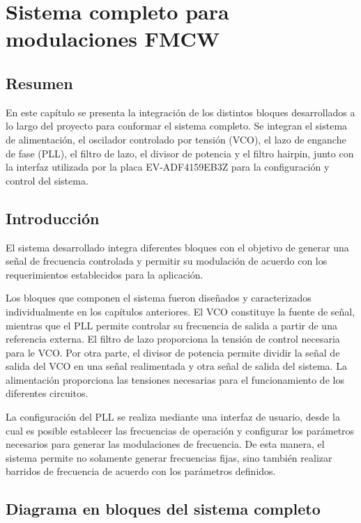 \chapter{Sistema completo para modulaciones FMCW}

\section*{Resumen}

En este capítulo se presenta la integración de los distintos bloques desarrollados a lo largo del proyecto para conformar el sistema completo. Se integran el sistema de alimentación, el oscilador controlado por tensión (VCO), el lazo de enganche de fase (PLL), el filtro de lazo, el divisor de potencia y el filtro hairpin, junto con la interfaz utilizada por la placa EV-ADF4159EB3Z para la configuración y control del sistema.

\section{Introducción}

El sistema desarrollado integra diferentes bloques con el objetivo de generar una señal de frecuencia controlada y permitir su modulación de acuerdo con los requerimientos establecidos para la aplicación.

Los bloques que componen el sistema fueron diseñados y caracterizados individualmente en los capítulos anteriores. El VCO constituye la fuente de señal, mientras que el PLL permite controlar su frecuencia de salida a partir de una referencia externa. El filtro de lazo proporciona la tensión de control necesaria para le VCO. Por otra parte, el divisor de potencia permite dividir la señal de salida del VCO en una señal realimentada y otra señal de salida del sistema. La alimentación proporciona las tensiones necesarias para el funcionamiento de los diferentes circuitos.

La configuración del PLL se realiza mediante una interfaz de usuario, desde la cual es posible establecer las frecuencias de operación y configurar los parámetros necesarios para generar las modulaciones de frecuencia. De esta manera, el sistema permite no solamente generar frecuencias fijas, sino también realizar barridos de frecuencia de acuerdo con los parámetros definidos.

\section{Diagrama en bloques del sistema completo}


